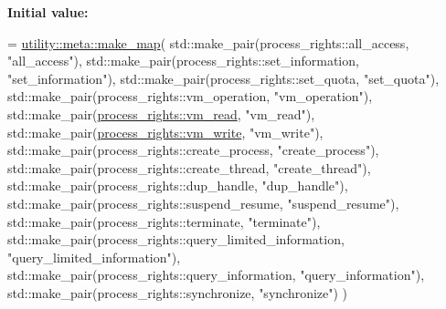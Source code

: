 {\bfseries Initial value\+:}
\begin{DoxyCode}
= \mbox{\hyperlink{namespacedistant_1_1utility_1_1meta_ad53bb77fc3e8c9138d6bb147cd9f4708}{utility::meta::make\_map}}(
            std::make\_pair(process\_rights::all\_access, \textcolor{stringliteral}{"all\_access"}),
            std::make\_pair(process\_rights::set\_information, \textcolor{stringliteral}{"set\_information"}),
            std::make\_pair(process\_rights::set\_quota, \textcolor{stringliteral}{"set\_quota"}),
            std::make\_pair(process\_rights::vm\_operation, \textcolor{stringliteral}{"vm\_operation"}),
            std::make\_pair(\mbox{\hyperlink{namespacedistant_a671e87e004e808bfc0d54a4e816981df}{process\_rights::vm\_read}}, \textcolor{stringliteral}{"vm\_read"}),
            std::make\_pair(\mbox{\hyperlink{namespacedistant_a615d59c8cd8088e5d008fe35512e6d5e}{process\_rights::vm\_write}}, \textcolor{stringliteral}{"vm\_write"}),
            std::make\_pair(process\_rights::create\_process, \textcolor{stringliteral}{"create\_process"}),
            std::make\_pair(process\_rights::create\_thread, \textcolor{stringliteral}{"create\_thread"}),
            std::make\_pair(process\_rights::dup\_handle, \textcolor{stringliteral}{"dup\_handle"}),
            std::make\_pair(process\_rights::suspend\_resume, \textcolor{stringliteral}{"suspend\_resume"}),
            std::make\_pair(process\_rights::terminate, \textcolor{stringliteral}{"terminate"}),
            std::make\_pair(process\_rights::query\_limited\_information, \textcolor{stringliteral}{"query\_limited\_information"}),
            std::make\_pair(process\_rights::query\_information, \textcolor{stringliteral}{"query\_information"}),
            std::make\_pair(process\_rights::synchronize, \textcolor{stringliteral}{"synchronize"})
        )
\end{DoxyCode}
